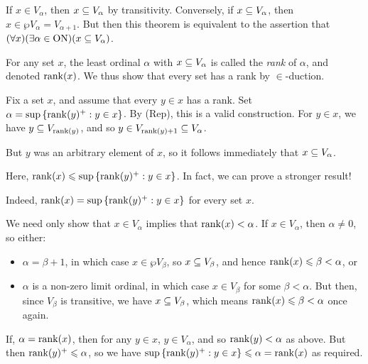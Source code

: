 \documentclass{article}
\begin{document}
\begin{prf}
    If $x \in V_\alpha$, then $x \subseteq V_\alpha$ by transitivity. Conversely, if $x \subseteq V_\alpha$, then $x \in \wp V_\alpha = V_{\alpha + 1}$. But then this theorem is equivalent to the assertion that $(\forall x)(\exists \alpha \in \mathrm{ON})(x \subseteq V_\alpha)$.
    
    For any set $x$, the least ordinal $\alpha$ with $x \subseteq V_\alpha$ is called the \textit{rank} of $\alpha$, and denoted $\operatorname{rank}(x)$. We thus show that every set has a rank by $\in$-duction.
    
    Fix a set $x$, and assume that every $y \in x$ has a rank. Set $\alpha = \sup \left\lbrace \operatorname{rank}(y)^+ : y \in x \right\rbrace$. By (Rep), this is a valid construction. For $y \in x$, we have $y \subseteq V_{\operatorname{rank}(y)}$, and so $y \in V_{\operatorname{rank}(y) + 1} \subseteq V_\alpha$.
    
    But $y$ was an arbitrary element of $x$, so it follows immediately that $x \subseteq V_\alpha$.
\end{prf}

\begin{corollary}
    Here, $\operatorname{rank}(x) \leqslant \sup \left\lbrace \operatorname{rank}(y)^+ : y \in x \right\rbrace$. In fact, we can prove a stronger result!
\end{corollary}

\begin{proposition}
    Indeed, $\operatorname{rank}(x) = \sup \left\lbrace \operatorname{rank}(y)^+ : y \in x \right\rbrace$ for every set $x$.
\end{proposition}

\begin{prf}
    We need only show that $x \in V_\alpha$ implies that $\operatorname{rank}(x) < \alpha$. If $x \in V_\alpha$, then $\alpha \neq 0$, so either:
    \begin{itemize}
	    \item $\alpha = \beta + 1$, in which case $x \in \wp V_\beta$, so $x \subseteq V_\beta$, and hence $\operatorname{rank}(x) \leqslant \beta < \alpha$, or
	    \item $\alpha$ is a non-zero limit ordinal, in which case $x \in V_\beta$ for some $\beta < \alpha$. But then, since $V_\beta$ is transitive, we have $x \subseteq V_\beta$, which means $\operatorname{rank}(x) \leqslant \beta < \alpha$ once again.
	\end{itemize}
	If, $\alpha = \operatorname{rank}(x)$, then for any $y \in x$, $y \in V_\alpha$, and so $\operatorname{rank}(y) < \alpha$ as above. But then $\operatorname{rank}(y)^+ \leqslant \alpha$, so we have $\sup \left\lbrace \operatorname{rank}(y)^+ : y \in x \right\rbrace \leqslant \alpha = \operatorname{rank}(x)$ as required.
\end{prf}
\end{document}
